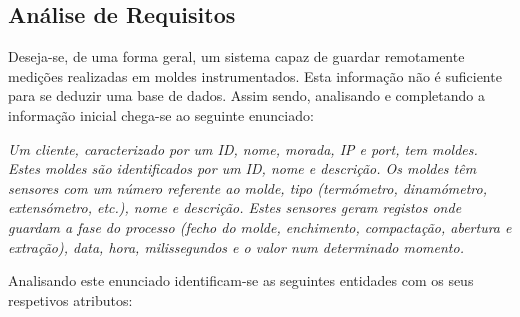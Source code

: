 \documentclass[11pt,twoside,a4paper]{report}
\begin{document}
\subsection{Análise de Requisitos}
Deseja-se, de uma forma geral, um sistema capaz de guardar remotamente medições realizadas em moldes instrumentados. Esta informação não é suficiente para se deduzir uma base de dados. Assim sendo, analisando e completando a informação inicial chega-se ao seguinte enunciado:\par 
\vspace{2ex}
\textit{Um cliente, caracterizado por um ID, nome, morada, IP e port, tem moldes. Estes moldes são identificados por um ID, nome e descrição. Os moldes têm sensores com um número referente ao molde, tipo (termómetro, dinamómetro, extensómetro, etc.), nome e descrição. Estes sensores geram registos onde guardam a fase do processo (fecho do molde, enchimento, compactação, abertura e extração), data, hora, milissegundos e o valor num determinado momento.}\par 
\vspace{2ex}
Analisando este enunciado identificam-se as seguintes entidades com os seus respetivos atributos:
\end{document}
